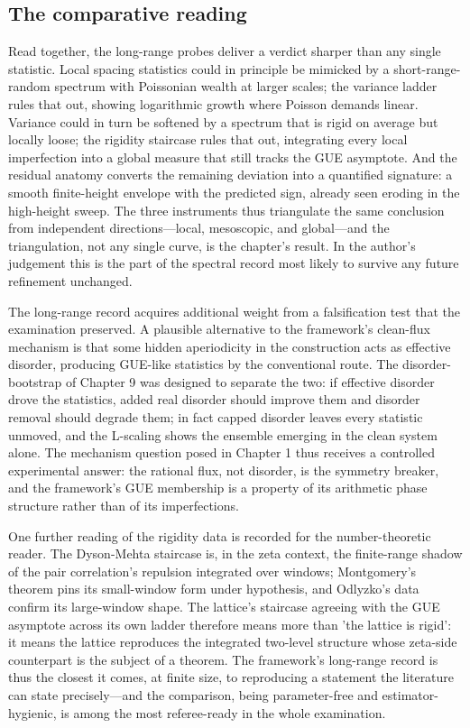 \documentclass[10pt]{article}
\begin{document}
\subsection{The comparative reading}\label{sec:95}
Read together, the long-range probes deliver a verdict sharper than any single statistic. Local spacing statistics could in principle be mimicked by a short-range-random spectrum with Poissonian wealth at larger scales; the variance ladder rules that out, showing logarithmic growth where Poisson demands linear. Variance could in turn be softened by a spectrum that is rigid on average but locally loose; the rigidity staircase rules that out, integrating every local imperfection into a global measure that still tracks the GUE asymptote. And the residual anatomy converts the remaining deviation into a quantified signature: a smooth finite-height envelope with the predicted sign, already seen eroding in the high-height sweep. The three instruments thus triangulate the same conclusion from independent directions---local, mesoscopic, and global---and the triangulation, not any single curve, is the chapter's result. In the author's judgement this is the part of the spectral record most likely to survive any future refinement unchanged.

The long-range record acquires additional weight from a falsification test that the examination preserved. A plausible alternative to the framework's clean-flux mechanism is that some hidden aperiodicity in the construction acts as effective disorder, producing GUE-like statistics by the conventional route. The disorder-bootstrap of Chapter 9 was designed to separate the two: if effective disorder drove the statistics, added real disorder should improve them and disorder removal should degrade them; in fact capped disorder leaves every statistic unmoved, and the L-scaling shows the ensemble emerging in the clean system alone. The mechanism question posed in Chapter 1 thus receives a controlled experimental answer: the rational flux, not disorder, is the symmetry breaker, and the framework's GUE membership is a property of its arithmetic phase structure rather than of its imperfections.

One further reading of the rigidity data is recorded for the number-theoretic reader. The Dyson-Mehta staircase is, in the zeta context, the finite-range shadow of the pair correlation's repulsion integrated over windows; Montgomery's theorem pins its small-window form under hypothesis, and Odlyzko's data confirm its large-window shape. The lattice's staircase agreeing with the GUE asymptote across its own ladder therefore means more than 'the lattice is rigid': it means the lattice reproduces the integrated two-level structure whose zeta-side counterpart is the subject of a theorem. The framework's long-range record is thus the closest it comes, at finite size, to reproducing a statement the literature can state precisely---and the comparison, being parameter-free and estimator-hygienic, is among the most referee-ready in the whole examination.
\end{document}
